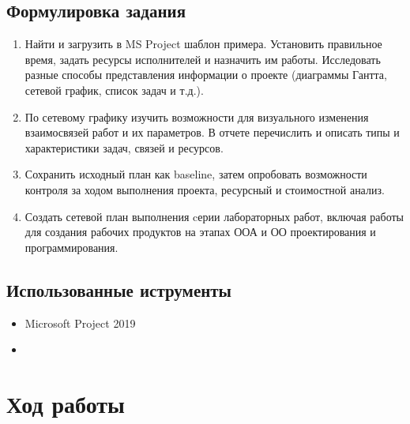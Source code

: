 \documentclass[a4paper, 14pt]{extarticle}
\begin{document}
\subsection{Формулировка задания}
\begin{enumerate}
    \item Найти и загрузить в MS Project шаблон примера. Установить правильное время, задать ресурсы исполнителей и назначить им работы. Исследовать разные способы представления информации о проекте (диаграммы Гантта, сетевой график, список задач и т.д.).
    \item По сетевому графику изучить возможности для визуального изменения взаимосвязей работ и их параметров. В отчете перечислить и описать типы и характеристики задач, связей и ресурсов.
    \item Сохранить исходный план как baseline, затем опробовать возможности контроля за ходом выполнения проекта, ресурсный и стоимостной анализ.
    \item Создать сетевой план выполнения cерии лабораторных работ, включая работы для создания рабочих продуктов на этапах ООА и ОО проектирования и программирования.
\end{enumerate}

\subsection{Использованные иструменты}
\begin{itemize}
    \item Microsoft Project 2019~\cite{biafore2013microsoft}
    \item \XeLaTeX{}
\end{itemize}

\section{Ход работы}
\end{document}
